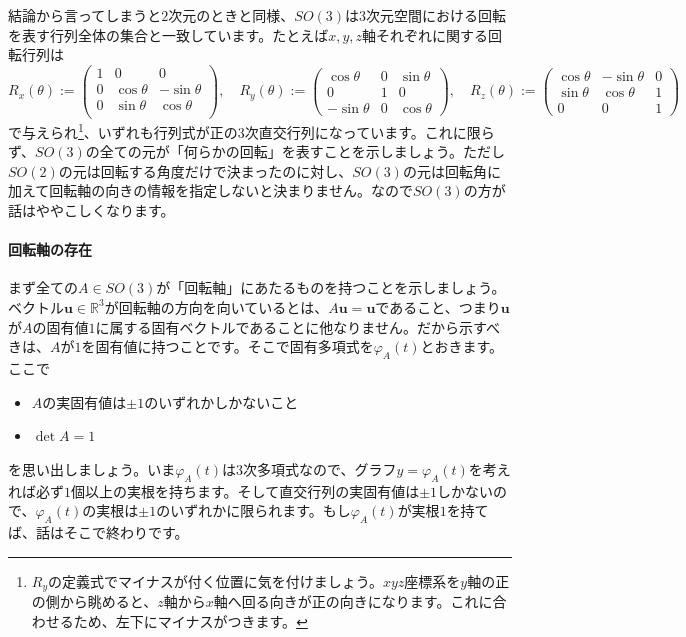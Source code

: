 結論から言ってしまうと$2$次元のときと同様、$SO(3)$は$3$次元空間における回転を表す行列全体の集合と一致しています。たとえば$x, y, z$軸それぞれに関する回転行列は
\[
R_x(\theta) :=
\begin{pmatrix}
1 & 0 & 0 \\
0 & \cos \theta & -\sin \theta \\
0 & \sin \theta & \cos \theta \\
\end{pmatrix}, \quad
R_y(\theta) :=
\begin{pmatrix}
\cos \theta & 0 & \sin \theta \\
0 & 1 & 0 \\
-\sin \theta & 0 & \cos \theta
\end{pmatrix}, \quad
R_z(\theta) :=
\begin{pmatrix}
\cos \theta & -\sin \theta & 0 \\
\sin \theta & \cos \theta & 1 \\
0 & 0 & 1
\end{pmatrix}
\]
で与えられ\footnote{$R_y$の定義式でマイナスが付く位置に気を付けましょう。$xyz$座標系を$y$軸の正の側から眺めると、$z$軸から$x$軸へ回る向きが正の向きになります。これに合わせるため、左下にマイナスがつきます。}、いずれも行列式が正の$3$次直交行列になっています。これに限らず、$SO(3)$の全ての元が「何らかの回転」を表すことを示しましょう。ただし$SO(2)$の元は回転する角度だけで決まったのに対し、$SO(3)$の元は回転角に加えて回転軸の向きの情報を指定しないと決まりません。なので$SO(3)$の方が話はややこしくなります。

\paragraph{回転軸の存在}

まず全ての$A \in SO(3)$が「回転軸」にあたるものを持つことを示しましょう。ベクトル$\bm{u} \in \mathbb{R}^3$が回転軸の方向を向いているとは、$A\bm{u} = \bm{u}$であること、つまり$\bm{u}$が$A$の固有値$1$に属する固有ベクトルであることに他なりません。だから示すべきは、$A$が$1$を固有値に持つことです。そこで固有多項式を$\varphi_A(t)$とおきます。ここで
\begin{itemize}
\item $A$の実固有値は$\pm1$のいずれかしかないこと
\item $\det A = 1$
\end{itemize}
を思い出しましょう。いま$\varphi_A(t)$は$3$次多項式なので、グラフ$y = \varphi_A(t)$を考えれば必ず$1$個以上の実根を持ちます。そして直交行列の実固有値は$\pm1$しかないので、$\varphi_A(t)$の実根は$\pm1$のいずれかに限られます。もし$\varphi_A(t)$が実根$1$を持てば、話はそこで終わりです。

